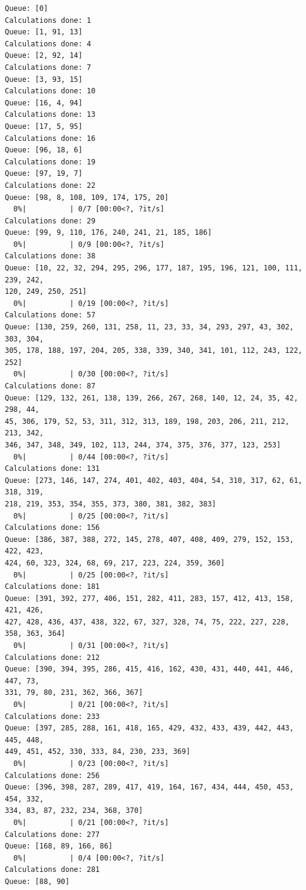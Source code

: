\begin{verbatim}
Queue: [0]
Calculations done: 1
Queue: [1, 91, 13]
Calculations done: 4
Queue: [2, 92, 14]
Calculations done: 7
Queue: [3, 93, 15]
Calculations done: 10
Queue: [16, 4, 94]
Calculations done: 13
Queue: [17, 5, 95]
Calculations done: 16
Queue: [96, 18, 6]
Calculations done: 19
Queue: [97, 19, 7]
Calculations done: 22
Queue: [98, 8, 108, 109, 174, 175, 20]
  0%|          | 0/7 [00:00<?, ?it/s]
Calculations done: 29
Queue: [99, 9, 110, 176, 240, 241, 21, 185, 186]
  0%|          | 0/9 [00:00<?, ?it/s]
Calculations done: 38
Queue: [10, 22, 32, 294, 295, 296, 177, 187, 195, 196, 121, 100, 111, 239, 242, 
120, 249, 250, 251]
  0%|          | 0/19 [00:00<?, ?it/s]
Calculations done: 57
Queue: [130, 259, 260, 131, 258, 11, 23, 33, 34, 293, 297, 43, 302, 303, 304, 
305, 178, 188, 197, 204, 205, 338, 339, 340, 341, 101, 112, 243, 122, 252]
  0%|          | 0/30 [00:00<?, ?it/s]
Calculations done: 87
Queue: [129, 132, 261, 138, 139, 266, 267, 268, 140, 12, 24, 35, 42, 298, 44, 
45, 306, 179, 52, 53, 311, 312, 313, 189, 198, 203, 206, 211, 212, 213, 342, 
346, 347, 348, 349, 102, 113, 244, 374, 375, 376, 377, 123, 253]
  0%|          | 0/44 [00:00<?, ?it/s]
Calculations done: 131
Queue: [273, 146, 147, 274, 401, 402, 403, 404, 54, 310, 317, 62, 61, 318, 319, 
218, 219, 353, 354, 355, 373, 380, 381, 382, 383]
  0%|          | 0/25 [00:00<?, ?it/s]
Calculations done: 156
Queue: [386, 387, 388, 272, 145, 278, 407, 408, 409, 279, 152, 153, 422, 423, 
424, 60, 323, 324, 68, 69, 217, 223, 224, 359, 360]
  0%|          | 0/25 [00:00<?, ?it/s]
Calculations done: 181
Queue: [391, 392, 277, 406, 151, 282, 411, 283, 157, 412, 413, 158, 421, 426, 
427, 428, 436, 437, 438, 322, 67, 327, 328, 74, 75, 222, 227, 228, 358, 363, 364]
  0%|          | 0/31 [00:00<?, ?it/s]
Calculations done: 212
Queue: [390, 394, 395, 286, 415, 416, 162, 430, 431, 440, 441, 446, 447, 73, 
331, 79, 80, 231, 362, 366, 367]
  0%|          | 0/21 [00:00<?, ?it/s]
Calculations done: 233
Queue: [397, 285, 288, 161, 418, 165, 429, 432, 433, 439, 442, 443, 445, 448, 
449, 451, 452, 330, 333, 84, 230, 233, 369]
  0%|          | 0/23 [00:00<?, ?it/s]
Calculations done: 256
Queue: [396, 398, 287, 289, 417, 419, 164, 167, 434, 444, 450, 453, 454, 332, 
334, 83, 87, 232, 234, 368, 370]
  0%|          | 0/21 [00:00<?, ?it/s]
Calculations done: 277
Queue: [168, 89, 166, 86]
  0%|          | 0/4 [00:00<?, ?it/s]
Calculations done: 281
Queue: [88, 90]
\end{verbatim}

